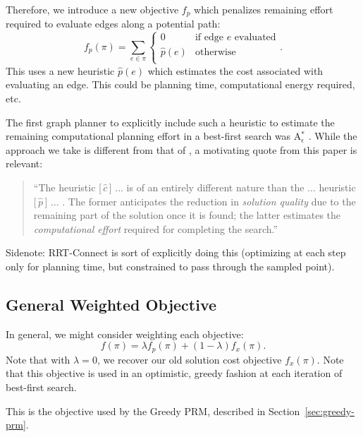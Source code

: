 Therefore, we introduce a new objective $f_p$
which penalizes remaining effort required to evaluate edges
along a potential path:
\begin{equation}
   f_p(\pi) = \sum_{e \in \pi} \left\{
   \begin{array}{cl}
      0 & \mbox{if edge } e \mbox{ evaluated}  \\
      \hat{p}(e) & \mbox{otherwise} \\
   \end{array}
   \right.
   .
\end{equation}
This uses a new heuristic $\hat{p}(e)$ which estimates the cost
associated with evaluating an edge.
This could be planning time, computational energy required, etc.

The first graph planner to explicitly include such a heuristic
to estimate the remaining
computational planning effort in a best-first search
was A$_\epsilon^*$ \cite{pearl1982semiadmissible}.
While the approach we take is different from that of
\cite{pearl1982semiadmissible},
a motivating quote from this paper is relevant:
\begin{quote}
``The heuristic [\,$\hat{c}$\,] ... is of an entirely
different nature than the ... heuristic [\,$\hat{p}$\,] ... .
The former anticipates the reduction in \emph{solution quality} due to the
remaining part of the solution once it is found;
the latter estimates the \emph{computational effort}
required for completing the search.''
\end{quote}

Sidenote: RRT-Connect is sort of explicitly doing this
(optimizing at each step only for planning time,
but constrained to pass through the sampled point).

\subsection{General Weighted Objective}

In general, we might consider weighting each objective:
\begin{equation}
   f(\pi) = \lambda f_p(\pi) + (1 - \lambda) f_x(\pi) .
   \label{eqn:general-objective}
\end{equation}
Note that with $\lambda=0$,
we recover our old solution cost objective $f_x(\pi)$.
Note that this objective is used in an optimistic, greedy fashion at each
iteration of best-first search.

This is the objective used by the Greedy PRM,
described in Section~\ref{sec:greedy-prm}.

